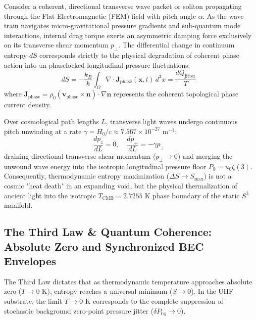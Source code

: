 \documentclass[11pt,a4paper]{article}
\begin{document}
	Consider a coherent, directional transverse wave packet or soliton propagating through the Flat Electromagnetic (FEM) field with pitch angle $\alpha$. As the wave train navigates micro-gravitational pressure gradients and sub-quantum mode interactions, internal drag torque exerts an asymmetric damping force exclusively on its transverse shear momentum $p_\perp$. The differential change in continuum entropy $dS$ corresponds strictly to the physical degradation of coherent phase action into un-phaselocked longitudinal pressure fluctuations:
	\begin{equation}
		dS = -\frac{k_B}{\hbar} \int_{\Omega} \nabla \cdot \mathbf{J}_{\text{phase}}(\mathbf{x}, t) \, d^3x = \frac{dQ_{\text{jitter}}}{T}
	\end{equation}
	where $\mathbf{J}_{\text{phase}} = \rho_0 (\mathbf{v}_{\text{phase}} \times \mathbf{n}) \cdot \nabla \mathbf{n}$ represents the coherent topological phase current density. 
	
	Over cosmological path lengths $L$, transverse light waves undergo continuous pitch unwinding at a rate $\gamma = H_0 / c \approx 7.567 \times 10^{-27} \text{ m}^{-1}$:
	\begin{equation}
		\frac{dp_z}{dL} = 0, \quad \frac{dp_\perp}{dL} = -\gamma p_\perp
	\end{equation}
	draining directional transverse shear momentum ($p_\perp \to 0$) and merging the unwound wave energy into the isotropic longitudinal pressure floor $P_0 = u_0 \zeta(3)$. Consequently, thermodynamic entropy maximization ($\Delta S \to S_{\text{max}}$) is not a cosmic "heat death" in an expanding void, but the physical thermalization of ancient light into the isotropic $T_{\text{CMB}} = 2.7255\text{ K}$ phase boundary of the static $S^3$ manifold.
	
	\subsection{The Third Law \& Quantum Coherence: Absolute Zero and Synchronized BEC Envelopes}
	The Third Law dictates that as thermodynamic temperature approaches absolute zero ($T \to 0\text{ K}$), entropy reaches a universal minimum ($S \to 0$). In the UHF substrate, the limit $T \to 0\text{ K}$ corresponds to the complete suppression of stochastic background zero-point pressure jitter ($\delta P_{\text{bg}} \to 0$).
	
\end{document}
